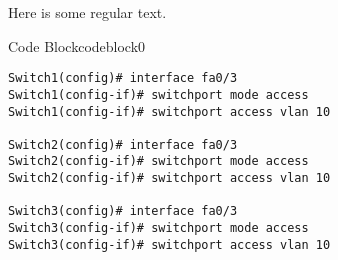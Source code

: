 \documentclass{article}
\begin{document}
Here is some regular text. \\
\vspace{0.5cm}




\begin{ocg}{Code Block}{codeblock}{0}
\vspace{0.5cm}
\begin{lstlisting}
Switch1(config)# interface fa0/3
Switch1(config-if)# switchport mode access
Switch1(config-if)# switchport access vlan 10

Switch2(config)# interface fa0/3
Switch2(config-if)# switchport mode access
Switch2(config-if)# switchport access vlan 10

Switch3(config)# interface fa0/3
Switch3(config-if)# switchport mode access
Switch3(config-if)# switchport access vlan 10
\end{lstlisting}
\end{ocg}
\end{document}

